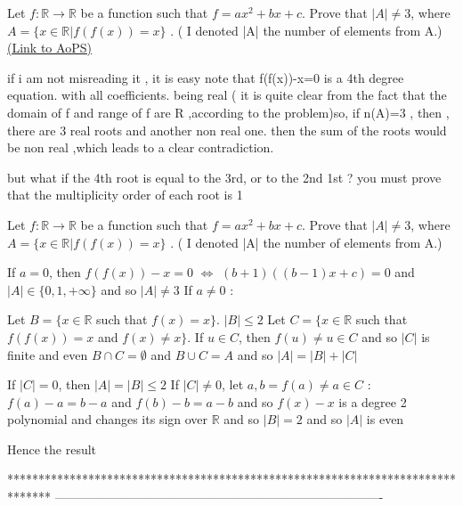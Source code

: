 \begin{problem}
	Let $ f:\mathbb{R} \rightarrow \mathbb{R}$ be a function such that $f=ax^2+bx+c$. Prove that  $|A| \neq 3 $, where $A =\{x\in\mathbb{R} | f(f(x))=x\}$ . ( I denoted |A| the number of elements from A.)
	\flushright \href{https://artofproblemsolving.com/community/c6h478974}{(Link to AoPS)}
\end{problem}



\begin{solution}
	if i am not misreading it , it is easy
note that f(f(x))-x=0 is a 4th degree equation. with all coefficients. being real ( it is quite clear from the fact that the domain of f and range of f are R ,according to the problem)so, if n(A)=3 , then , there are 3 real roots and another non real one. then the sum of the roots would be non real ,which leads to a clear contradiction. 
\end{solution}



\begin{solution}
	but what if the 4th root is equal to the 3rd, or to the 2nd\/ 1st ?
you must prove that the multiplicity order of each root is 1
\end{solution}



\begin{solution}
	\begin{tcolorbox}Let $ f:\mathbb{R} \rightarrow \mathbb{R}$ be a function such that $f=ax^2+bx+c$. Prove that  $|A| \neq 3 $, where $A =\{x\in\mathbb{R} | f(f(x))=x\}$ . ( I denoted |A| the number of elements from A.)\end{tcolorbox}
If $a=0$, then $f(f(x))-x=0$ $\iff$ $(b+1)((b-1)x+c)=0$ and $|A|\in\{0,1,+\infty\}$ and so $|A|\ne 3$
If $a\ne 0$ :

Let $B=\{x\in\mathbb R$ such that $f(x)=x\}$. $|B|\le 2$
Let $C=\{x\in\mathbb R$ such that $f(f(x))=x$ and $f(x)\ne x\}$. If $u\in C$, then $f(u)\ne u\in C$ and so $|C|$ is finite and even
$B\cap C=\emptyset$ and $B\cup C=A$ and so $|A|=|B|+|C|$

If $|C|=0$, then $|A|=|B|\le 2$
If $|C|\ne 0$, let $a,b=f(a)\ne a\in C$ : $f(a)-a=b-a$ and $f(b)-b=a-b$ and so $f(x)-x$ is a degree 2 polynomial and changes its sign over $\mathbb R$ and so $|B|=2$ and so $|A|$ is even

Hence the result
\end{solution}
*******************************************************************************
-------------------------------------------------------------------------------

